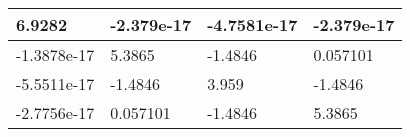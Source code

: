 \begin{tabular}{|l|l|l|l|}
\hline
6.9282&-2.379e-17&-4.7581e-17&-2.379e-17\\\hline
-1.3878e-17&5.3865&-1.4846&0.057101\\\hline
-5.5511e-17&-1.4846&3.959&-1.4846\\\hline
-2.7756e-17&0.057101&-1.4846&5.3865\\\hline
\end{tabular}
